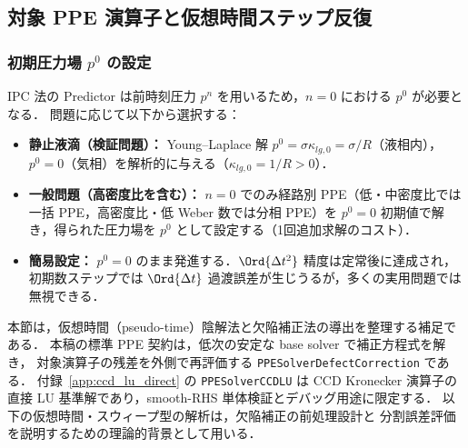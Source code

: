 %
\subsection{対象 PPE 演算子と仮想時間ステップ反復}
\label{sec:ppe_pseudotime}

\subsubsection{\texorpdfstring{初期圧力場 $p^0$ の設定}{初期圧力場 p0 の設定}}
\label{sec:ppe_p0_init}

IPC 法の Predictor は前時刻圧力 $p^n$ を用いるため，$n=0$ における $p^0$ が必要となる．
問題に応じて以下から選択する：
\begin{itemize}
  \item \textbf{静止液滴（検証問題）：} Young--Laplace 解 $p^0 = \sigma\kappa_{lg,0} = \sigma/R$（液相内），$p^0 = 0$（気相）を解析的に与える（$\kappa_{lg,0} = 1/R > 0$）．
  \item \textbf{一般問題（高密度比を含む）：} $n=0$ でのみ経路別 PPE（低・中密度比では一括 PPE，高密度比・低 Weber 数では分相 PPE）を $p^0 = 0$ 初期値で解き，得られた圧力場を $p^0$ として設定する（1回追加求解のコスト）．
  \item \textbf{簡易設定：} $p^0 = 0$ のまま発進する．$\Ord{\Delta t^2}$ 精度は定常後に達成され，初期数ステップでは $\Ord{\Delta t}$ 過渡誤差が生じうるが，多くの実用問題では無視できる．
\end{itemize}

\medskip
本節は，仮想時間（pseudo-time）陰解法と欠陥補正法の導出を整理する補足である．
本稿の標準 PPE 契約は，低次の安定な base solver で補正方程式を解き，
対象演算子の残差を外側で再評価する \texttt{PPESolverDefectCorrection} である．
付録~\ref{app:ccd_lu_direct} の \texttt{PPESolverCCDLU} は CCD Kronecker 演算子の
直接 LU 基準解であり，smooth-RHS 単体検証とデバッグ用途に限定する．
以下の仮想時間・スウィープ型の解析は，欠陥補正の前処理設計と
分割誤差評価を説明するための理論的背景として用いる．

